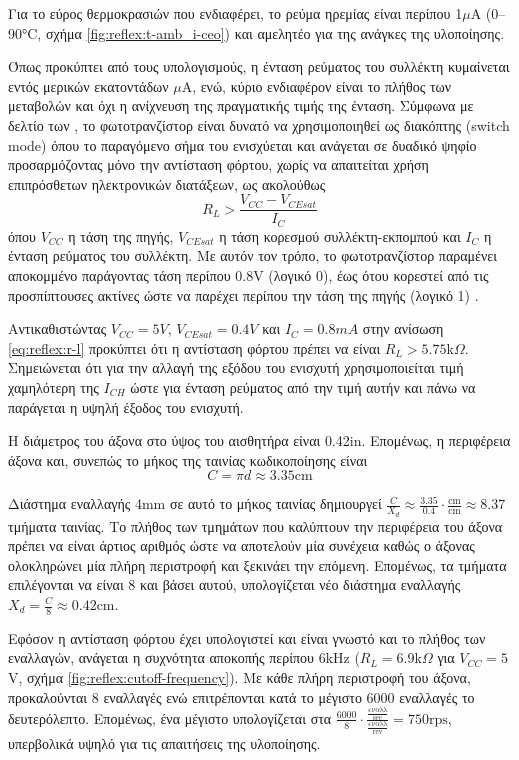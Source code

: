 Για το εύρος θερμοκρασιών που ενδιαφέρει, το ρεύμα ηρεμίας είναι περίπου
1$\mu$A (0--90°C, σχήμα \ref{fig:reflex:t-amb_i-ceo}) και αμελητέο για της
ανάγκες της υλοποίησης.

Όπως προκύπτει από τους υπολογισμούς, η ένταση ρεύματος του συλλέκτη κυμαίνεται
εντός μερικών εκατοντάδων $\mu$A, ενώ, κύριο ενδιαφέρον είναι το πλήθος των
μεταβολών και όχι η ανίχνευση της πραγματικής τιμής της ένταση.
Σύμφωνα με δελτίο των \textcites{optek04}{fairchild02}, το φωτοτρανζίστορ είναι
δυνατό να χρησιμοποιηθεί ως διακόπτης (switch mode) όπου το παραγόμενο σήμα του
ενισχύεται και ανάγεται σε δυαδικό ψηφίο προσαρμόζοντας μόνο την αντίσταση
φόρτου, χωρίς να απαιτείται χρήση επιπρόσθετων ηλεκτρονικών διατάξεων, ως
ακολούθως
\begin{equation}
R_L > \frac{V_{CC} - V_{CEsat}}{I_C} \label{eq:reflex:r-l}
\end{equation}
όπου $V_{CC}$ η τάση της πηγής, $V_{CEsat}$ η τάση κορεσμού συλλέκτη-εκπομπού
και $I_C$ η ένταση ρεύματος του συλλέκτη. Με αυτόν τον τρόπο, το φωτοτρανζίστορ
παραμένει αποκομμένο παράγοντας τάση περίπου 0.8V (λογικό 0), έως ότου κορεστεί
από τις προσπίπτουσες ακτίνες ώστε να παρέχει περίπου την τάση της πηγής
(λογικό 1) \parencite{fairchild02}.

Αντικαθιστώντας $V_{CC} = 5 V$, $V_{CEsat} = 0.4 V$ και $I_C = 0.8 mA$ στην
ανίσωση \eqref{eq:reflex:r-l} προκύπτει ότι η αντίσταση φόρτου πρέπει να είναι
$R_L > 5.75$k$\Omega$. Σημειώνεται ότι για την αλλαγή της εξόδου του ενισχυτή
χρησιμοποιείται τιμή χαμηλότερη της $I_{CH}$ ώστε για ένταση ρεύματος από την
τιμή αυτήν και πάνω να παράγεται η υψηλή έξοδος του ενισχυτή.

Η διάμετρος του άξονα στο ύψος του αισθητήρα είναι 0.42in. Επομένως, η
περιφέρεια άξονα και, συνεπώς το μήκος της ταινίας κωδικοποίησης είναι
\begin{equation}
C = \pi{}d \approx 3.35 \text{cm}
\end{equation}

Διάστημα εναλλαγής 4mm σε αυτό το μήκος ταινίας δημιουργεί
$\frac{C}{X_d} \approx \frac{3.35}{0.4} \cdot \frac{\text{cm}}{\text{cm}}
\approx 8.37$ τμήματα
ταινίας. Το πλήθος των τμημάτων που καλύπτουν την περιφέρεια του άξονα πρέπει να
είναι άρτιος αριθμός ώστε να αποτελούν μία συνέχεια καθώς ο άξονας ολοκληρώνει
μία πλήρη περιστροφή και ξεκινάει την επόμενη. Επομένως, τα τμήματα επιλέγονται
να είναι 8 και βάσει αυτού, υπολογίζεται νέο διάστημα εναλλαγής
$X_d = \frac{C}{8} \approx 0.42$cm.

Εφόσον η αντίσταση φόρτου έχει υπολογιστεί και είναι γνωστό και το πλήθος των
εναλλαγών, ανάγεται η συχνότητα αποκοπής περίπου 6kHz ($R_L = 6.9$k$\Omega$ για
$V_{CC} = 5$V, σχήμα \ref{fig:reflex:cutoff-frequency}). Με κάθε πλήρη
περιστροφή του άξονα, προκαλούνται 8 εναλλαγές ενώ επιτρέπονται κατά το μέγιστο
6000 εναλλαγές το δευτερόλεπτο. Επομένως, ένα μέγιστο υπολογίζεται στα
$\frac{6000}{8} \cdot
\frac{
    \frac{\text{εναλλ}}{\text{sec}}
}{
\frac{\text{εναλλ}}{\text{rev}}} = 750 \text{rps}$, υπερβολικά υψηλό για τις
απαιτήσεις της υλοποίησης.
